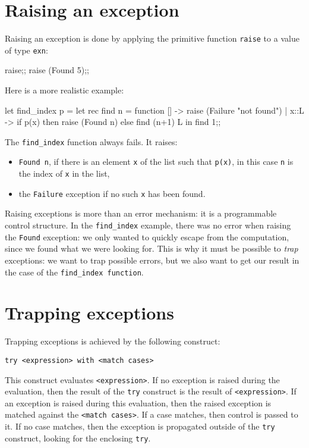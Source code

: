 \section{Raising an exception}

Raising an exception is done by applying the primitive function
\verb"raise" to a value of type \verb"exn":
\begin{caml_example}
raise;;
raise (Found 5);;
\end{caml_example}
Here is a more realistic example:
\begin{caml_example}
let find_index p =
  let rec find n =
    function [] -> raise (Failure "not found")
           | x::L -> if p(x) then raise (Found n)
                     else find (n+1) L
  in find 1;;
\end{caml_example}
The \verb"find_index" function always fails. It raises:
\begin{itemize}
\item {\tt Found n}, if there is an element {\tt x} of the list such that
      {\tt p(x)}, in this case {\tt n} is the index of {\tt x} in the list,
\item the {\tt Failure} exception if no such {\tt x} has been found.
\end{itemize}
Raising exceptions is more than an error mechanism: it is a programmable
control structure.
In the \verb"find_index" example, there was no error when raising the {\tt Found} exception: we
only wanted to quickly escape from the computation, since we found what we
were looking for.
This is why it must be possible to {\em trap} exceptions:
we want to trap possible errors, but we also want to get our result in the
case of the \verb"find_index function".

\section{Trapping exceptions}

Trapping exceptions is achieved by the following construct:
\begin{verbatim}
try <expression> with <match cases>
\end{verbatim}

This construct evaluates
\verb"<expression>". If no exception is raised during the evaluation, then
the result of the {\tt try} construct is the result of \verb"<expression>".
If an exception is raised during this evaluation, then the raised exception
is matched against the \verb"<match cases>". If a case matches, then control
is passed to it. If no case matches, then the exception is propagated
outside of the {\tt try} construct, looking for the enclosing {\tt try}.%

